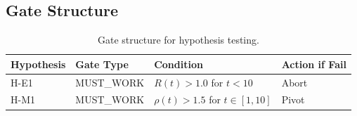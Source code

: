 \subsection{Gate Structure}

\begin{table}[h]
\centering
\begin{tabular}{@{}llll@{}}
\toprule
Hypothesis & Gate Type & Condition & Action if Fail \\
\midrule
H-E1 & MUST\_WORK & $R(t) > 1.0$ for $t < 10$ & Abort \\
H-M1 & MUST\_WORK & $\rho(t) > 1.5$ for $t \in [1,10]$ & Pivot \\
\bottomrule
\end{tabular}
\caption{Gate structure for hypothesis testing.}
\label{tab:gates}
\end{table}
